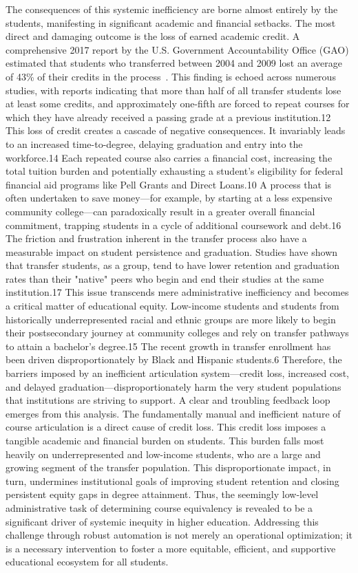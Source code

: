 \begin{introduction}
The consequences of this systemic inefficiency are borne almost entirely by the students, manifesting in significant academic and financial setbacks. The most direct and damaging outcome is the loss of earned academic credit. A comprehensive 2017 report by the U.S. Government Accountability Office (GAO) estimated that students who transferred between 2004 and 2009 lost an average of 43\% of their credits in the process~\cite{gao2017}. This finding is echoed across numerous studies, with reports indicating that more than half of all transfer students lose at least some credits, and approximately one-fifth are forced to repeat courses for which they have already received a passing grade at a previous institution.12
This loss of credit creates a cascade of negative consequences. It invariably leads to an increased time-to-degree, delaying graduation and entry into the workforce.14 Each repeated course also carries a financial cost, increasing the total tuition burden and potentially exhausting a student's eligibility for federal financial aid programs like Pell Grants and Direct Loans.10 A process that is often undertaken to save money—for example, by starting at a less expensive community college—can paradoxically result in a greater overall financial commitment, trapping students in a cycle of additional coursework and debt.16
The friction and frustration inherent in the transfer process also have a measurable impact on student persistence and graduation. Studies have shown that transfer students, as a group, tend to have lower retention and graduation rates than their "native" peers who begin and end their studies at the same institution.17 This issue transcends mere administrative inefficiency and becomes a critical matter of educational equity. Low-income students and students from historically underrepresented racial and ethnic groups are more likely to begin their postsecondary journey at community colleges and rely on transfer pathways to attain a bachelor's degree.15 The recent growth in transfer enrollment has been driven disproportionately by Black and Hispanic students.6 Therefore, the barriers imposed by an inefficient articulation system—credit loss, increased cost, and delayed graduation—disproportionately harm the very student populations that institutions are striving to support.
A clear and troubling feedback loop emerges from this analysis. The fundamentally manual and inefficient nature of course articulation is a direct cause of credit loss. This credit loss imposes a tangible academic and financial burden on students. This burden falls most heavily on underrepresented and low-income students, who are a large and growing segment of the transfer population. This disproportionate impact, in turn, undermines institutional goals of improving student retention and closing persistent equity gaps in degree attainment. Thus, the seemingly low-level administrative task of determining course equivalency is revealed to be a significant driver of systemic inequity in higher education. Addressing this challenge through robust automation is not merely an operational optimization; it is a necessary intervention to foster a more equitable, efficient, and supportive educational ecosystem for all students.



\end{introduction}

